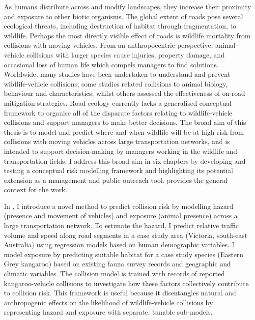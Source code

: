 \documentclass[titlesmallcaps,copyrightpage,examinerscopy]{uomthesis}
\begin{document}
\vspace{1.5cm}
As humans distribute across and modify landscapes, they increase their proximity and exposure to other biotic organisms. The global extent of roads pose several ecological threats, including destruction of habitat through fragmentation, to wildlife. Perhaps the most directly visible effect of roads is wildlife mortality from collisions with moving vehicles. From an anthropocentric perspective, animal-vehicle collisions with larger species cause injuries, property damage, and occasional loss of human life which compels managers to find solutions. Worldwide, many studies have been undertaken to understand and prevent wildlife-vehicle collisions; some studies related collisions to animal biology, behaviour and characteristics, whilst others assessed the effectiveness of on-road mitigation strategies. Road ecology currently lacks a generalised conceptual framework to organise all of the disparate factors relating to wildlife-vehicle collisions and support managers to make better decisions. The broad aim of this thesis is to model and predict where and when wildlife will be at high risk from collisions with moving vehicles across large transportation networks, and is intended to support decision-making by managers working in the wildlife and transportation fields. I address this broad aim in six chapters by developing and testing a conceptual risk modelling framework and highlighting its potential extension as a management and public outreach tool.  provides the general context for the work.

In , I introduce a novel method to predict collision risk by modelling hazard (presence and movement of vehicles) and exposure (animal presence) across a large transportation network. To estimate the hazard, I predict relative traffic volume and speed along road segments in a case study area (Victoria, south-east Australia) using regression models based on human demographic variables. I model exposure by predicting suitable habitat for a case study species (Eastern Grey kangaroo) based on existing fauna survey records and geographic and climatic variables. The collision model is trained with records of reported kangaroo-vehicle collisions to investigate how these factors collectively contribute to collision risk. This framework is useful because it disentangles natural and anthropogenic effects on the likelihood of wildlife-vehicle collisions by representing hazard and exposure with separate, tunable sub-models.
\end{document}
